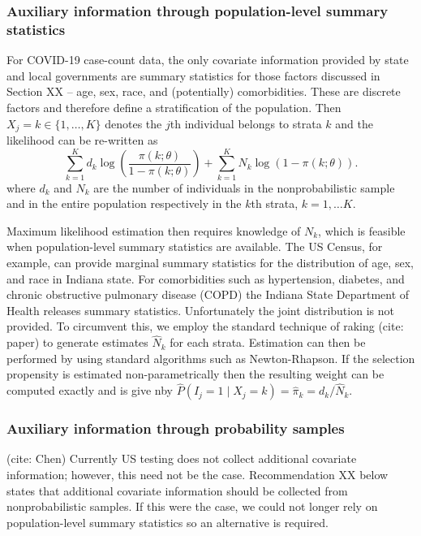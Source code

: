 \documentclass[11pt]{amsart}
\begin{document}
\subsubsection{Auxiliary information through population-level summary statistics}

For COVID-19 case-count data, the only covariate information provided by state and local governments are summary statistics for those factors discussed in Section XX -- age, sex, race, and (potentially) comorbidities.  These are discrete factors and therefore define a stratification of the population. Then $X_j = k \in \{1,\ldots,K\}$ denotes the $j$th individual belongs to strata $k$ and the likelihood can be re-written as
$$
\sum_{k=1}^K d_k \log \left( \frac{\pi (k; \theta)}{1-\pi(k; \theta)} \right) + \sum_{k=1}^K N_k \log \left( 1 - \pi (k; \theta) \right).
$$
where $d_k$ and $N_k$ are the number of individuals in the nonprobabilistic sample and in the entire population respectively in the $k$th strata, $k=1,\ldots K$.

Maximum likelihood estimation then requires knowledge of $N_k$, which is feasible when population-level summary statistics are available.  The US Census, for example, can provide marginal summary statistics for the distribution of age, sex, and race in Indiana state.  For comorbidities such as hypertension, diabetes, and chronic obstructive pulmonary disease (COPD) the Indiana State Department of Health releases summary statistics. Unfortunately the joint distribution is not provided.  To circumvent this, we employ the standard technique of raking (cite: paper) to generate estimates $\hat N_k$ for each strata.  Estimation can then be performed by using standard algorithms such as Newton-Rhapson.  If the selection propensity is estimated non-parametrically then the resulting weight can be computed exactly and is give nby $\hat P(I_j = 1 \mid X_j = k) = \hat \pi_k = d_k/\hat N_k$.

\subsubsection{Auxiliary information through probability samples}

(cite: Chen)
Currently US testing does not collect additional covariate information; however, this need not be the case.  Recommendation XX below states that additional covariate information should be collected from nonprobabilistic samples.  If this were the case, we could not longer rely on population-level summary statistics so an alternative is required.
\end{document}
